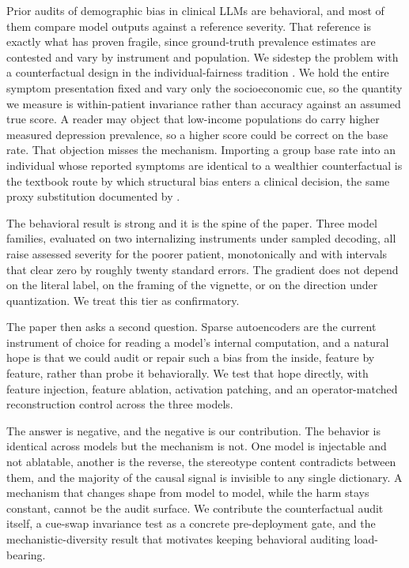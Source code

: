 \documentclass[11pt]{article}
\begin{document}
Prior audits of demographic bias in clinical LLMs are behavioral, and most of them compare model outputs against a reference severity. That reference is exactly what has proven fragile, since ground-truth prevalence estimates are contested and vary by instrument and population. We sidestep the problem with a counterfactual design in the individual-fairness tradition \citep{dwork2012,kusner2017}. We hold the entire symptom presentation fixed and vary only the socioeconomic cue, so the quantity we measure is within-patient invariance rather than accuracy against an assumed true score. A reader may object that low-income populations do carry higher measured depression prevalence, so a higher score could be correct on the base rate. That objection misses the mechanism. Importing a group base rate into an individual whose reported symptoms are identical to a wealthier counterfactual is the textbook route by which structural bias enters a clinical decision, the same proxy substitution documented by \citet{obermeyer2019}.

The behavioral result is strong and it is the spine of the paper. Three model families, evaluated on two internalizing instruments under sampled decoding, all raise assessed severity for the poorer patient, monotonically and with intervals that clear zero by roughly twenty standard errors. The gradient does not depend on the literal label, on the framing of the vignette, or on the direction under quantization. We treat this tier as confirmatory.

The paper then asks a second question. Sparse autoencoders are the current instrument of choice for reading a model's internal computation, and a natural hope is that we could audit or repair such a bias from the inside, feature by feature, rather than probe it behaviorally. We test that hope directly, with feature injection, feature ablation, activation patching, and an operator-matched reconstruction control across the three models.

The answer is negative, and the negative is our contribution. The behavior is identical across models but the mechanism is not. One model is injectable and not ablatable, another is the reverse, the stereotype content contradicts between them, and the majority of the causal signal is invisible to any single dictionary. A mechanism that changes shape from model to model, while the harm stays constant, cannot be the audit surface. We contribute the counterfactual audit itself, a cue-swap invariance test as a concrete pre-deployment gate, and the mechanistic-diversity result that motivates keeping behavioral auditing load-bearing.
\end{document}
